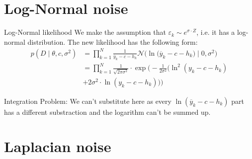 \documentclass{beamer}
\newcommand{\s}{\sigma^2}
\newcommand{\y}{\overline{y}}
\begin{document}
\section{Log-Normal noise}

	\begin{frame}{Log-Normal likelihood}
		We make the assumption that $\varepsilon_k \sim e^{\sigma \cdot Z}$, i.e. 			it has a  log-normal distribution. The new likelihood has the following 			form:
		\begin{align}
			p(D \mid \theta, c, \sigma^2) &= \prod_{k = 1}^N \frac{1}{\y_k - c 					- h_k}\mathcal{N}\bigl( \ln\bigl(\y_k - c - h_k\bigr) \mid 0, \s\bigr) 			\\
			&= \prod_{k = 1}^N \frac{1}{\sqrt{2\pi\s}} \cdot \exp\biggl(-\frac{1}				{2\s}\bigl(\ln^2(y_k - c - h_k) \\
			& + 2\s \cdot \ln(y_k - c - h_k)\bigr)\biggr)
		\end{align}
	\end{frame}

	\begin{frame}{Integration}
		Problem: We can't substitute here as every $\ln(\y_k - c - h_k)$ part has 			a different substraction and the logarithm can't be summed up.
	\end{frame}

\section{Laplacian noise}

	\begin{frame}
		
	\end{frame}
	
	
	
\end{document}
